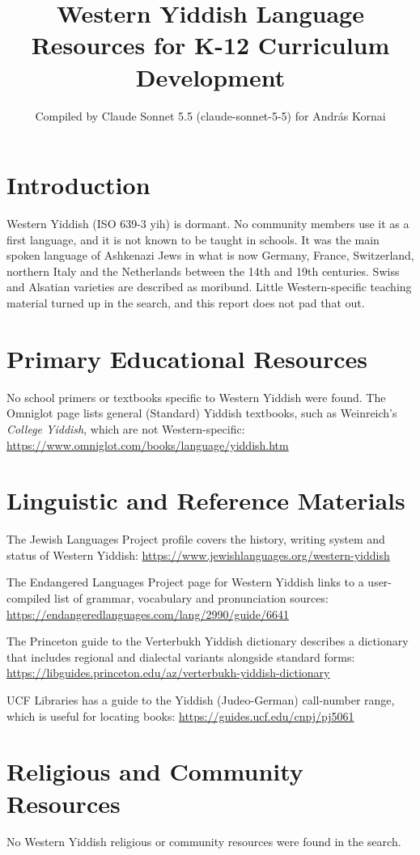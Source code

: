 \documentclass[12pt]{article}
\title{Western Yiddish Language Resources for K-12 Curriculum Development}
\author{Compiled by Claude Sonnet 5.5 (claude-sonnet-5-5) for Andr\'as Kornai}
\date{}
\begin{document}
\maketitle
\section{Introduction}
Western Yiddish (ISO 639-3 yih) is dormant. No community members use it as a first language, and it is not known to be taught in schools. It was the main spoken language of Ashkenazi Jews in what is now Germany, France, Switzerland, northern Italy and the Netherlands between the 14th and 19th centuries. Swiss and Alsatian varieties are described as moribund. Little Western-specific teaching material turned up in the search, and this report does not pad that out.
\section{Primary Educational Resources}
No school primers or textbooks specific to Western Yiddish were found. The Omniglot page lists general (Standard) Yiddish textbooks, such as Weinreich's \emph{College Yiddish}, which are not Western-specific: \url{https://www.omniglot.com/books/language/yiddish.htm}
\section{Linguistic and Reference Materials}
The Jewish Languages Project profile covers the history, writing system and status of Western Yiddish: \url{https://www.jewishlanguages.org/western-yiddish}

The Endangered Languages Project page for Western Yiddish links to a user-compiled list of grammar, vocabulary and pronunciation sources: \url{https://endangeredlanguages.com/lang/2990/guide/6641}

The Princeton guide to the Verterbukh Yiddish dictionary describes a dictionary that includes regional and dialectal variants alongside standard forms: \url{https://libguides.princeton.edu/az/verterbukh-yiddish-dictionary}

UCF Libraries has a guide to the Yiddish (Judeo-German) call-number range, which is useful for locating books: \url{https://guides.ucf.edu/cnpj/pj5061}
\section{Religious and Community Resources}
No Western Yiddish religious or community resources were found in the search.
\end{document}
